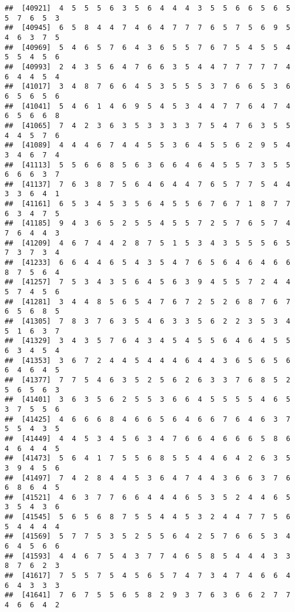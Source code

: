 \documentclass[
]{book}
\begin{document}
\begin{verbatim}
##  [40921]  4  5  5  5  6  3  5  6  4  4  4  3  5  5  6  6  5  6  5  5  7  6  5  3
##  [40945]  6  5  8  4  4  7  4  6  4  7  7  7  6  5  7  5  6  9  5  4  6  3  7  5
##  [40969]  5  4  6  5  7  6  4  3  6  5  5  7  6  7  5  4  5  5  4  5  5  4  5  6
##  [40993]  2  4  3  5  6  4  7  6  6  3  5  4  4  7  7  7  7  7  4  6  4  4  5  4
##  [41017]  3  4  8  7  6  6  4  5  3  5  5  5  3  7  6  6  5  3  6  6  5  6  5  6
##  [41041]  5  4  6  1  4  6  9  5  4  5  3  4  4  7  7  6  4  7  4  6  5  6  6  8
##  [41065]  7  4  2  3  6  3  5  3  3  3  3  7  5  4  7  6  3  5  5  4  4  5  7  6
##  [41089]  4  4  4  6  7  4  4  5  5  3  6  4  5  5  6  2  9  5  4  3  4  6  7  4
##  [41113]  5  5  6  6  8  5  6  3  6  6  4  6  4  5  5  7  3  5  5  6  6  6  3  7
##  [41137]  7  6  3  8  7  5  6  4  6  4  4  7  6  5  7  7  5  4  4  3  3  6  4  1
##  [41161]  6  5  3  4  5  3  5  6  4  5  5  6  7  6  7  1  8  7  7  6  3  4  7  5
##  [41185]  9  4  3  6  5  2  5  5  4  5  5  7  2  5  7  6  5  7  4  7  6  4  4  3
##  [41209]  4  6  7  4  4  2  8  7  5  1  5  3  4  3  5  5  5  6  5  7  3  7  3  4
##  [41233]  6  6  4  4  6  5  4  3  5  4  7  6  5  6  4  6  4  6  6  8  7  5  6  4
##  [41257]  7  5  3  4  3  5  6  4  5  6  3  9  4  5  5  7  2  4  4  5  7  4  5  6
##  [41281]  3  4  4  8  5  6  5  4  7  6  7  2  5  2  6  8  7  6  7  6  5  6  8  5
##  [41305]  7  8  3  7  6  3  5  4  6  3  3  5  6  2  2  3  5  3  4  5  1  6  3  7
##  [41329]  3  4  3  5  7  6  4  3  4  5  4  5  5  6  4  6  4  5  5  6  3  4  5  4
##  [41353]  3  6  7  2  4  4  5  4  4  4  6  4  4  3  6  5  6  5  6  6  4  6  4  5
##  [41377]  7  7  5  4  6  3  5  2  5  6  2  6  3  3  7  6  8  5  2  5  6  5  6  3
##  [41401]  3  6  3  5  6  2  5  5  3  6  6  4  5  5  5  5  4  6  5  3  7  5  5  6
##  [41425]  4  6  6  6  8  4  6  6  5  6  4  6  6  7  6  4  6  3  7  5  5  4  3  5
##  [41449]  4  4  5  3  4  5  6  3  4  7  6  6  4  6  6  6  5  8  6  4  6  4  4  5
##  [41473]  5  6  4  1  7  5  5  6  8  5  5  4  4  6  4  2  6  3  5  3  9  4  5  6
##  [41497]  7  4  2  8  4  4  5  3  6  4  7  4  4  3  6  6  3  7  6  6  8  6  4  5
##  [41521]  4  6  3  7  7  6  6  4  4  4  6  5  3  5  2  4  4  6  5  3  5  4  3  6
##  [41545]  5  6  5  6  8  7  5  5  4  4  5  3  2  4  4  7  7  5  6  5  4  4  4  4
##  [41569]  5  7  7  5  3  5  2  5  5  6  4  2  5  7  6  6  5  3  4  6  4  5  6  6
##  [41593]  4  4  6  7  5  4  3  7  7  4  6  5  8  5  4  4  4  3  3  8  7  6  2  3
##  [41617]  7  5  5  7  5  4  5  6  5  7  4  7  3  4  7  4  6  6  4  6  4  3  3  3
##  [41641]  7  6  7  5  5  6  5  8  2  9  3  7  6  3  6  6  2  7  7  4  6  6  4  2

\end{verbatim}
\end{document}
